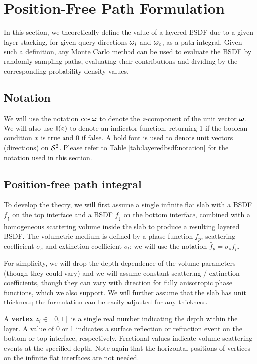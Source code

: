 \section{Position-Free Path Formulation}
\label{sec:layeredbsdf:pathformulation}

In this section, we theoretically define the value of a layered BSDF due to a given layer stacking, for given query directions $\bm{\omega}_i$ and $\bm{\omega}_o$, as a path integral. Given such a definition, any Monte Carlo method can be used to evaluate the BSDF by randomly sampling paths, evaluating their contributions and dividing by the corresponding probability density values.

\subsection{Notation}

We will use the notation $\cos \bm{\omega}$ to denote the $z$-component of the unit vector $\bm{\omega}$. We will also use $\mathbb{I}(x)$ to denote an indicator function, returning 1 if the boolean condition $x$ is true and 0 if false. A bold font is used to denote unit vectors (directions) on ${\mathcal S^2}$. Please refer to Table \ref{tab:layeredbsdf:notation} for the notation used in this section.



\subsection{Position-free path integral}

To develop the theory, we will first assume a single infinite flat slab with a BSDF $f_\uparrow$ on the top interface and a BSDF $f_\downarrow$ on the bottom interface, combined with a homogeneous scattering volume inside the slab to produce a resulting layered BSDF. The volumetric medium is defined by a phase function $f_p$, scattering coefficient $\sigma_s$ and extinction coefficient $\sigma_t$; we will use the notation $\hat f_p = \sigma_s f_p$.

For simplicity, we will drop the depth dependence of the volume parameters (though they could vary) and we will assume constant scattering / extinction coefficients, though they can vary with direction for fully anisotropic phase functions, which we also support. We will further assume that the slab has unit thickness; the formulation can be easily adjusted for any thickness.

A {\bf vertex} $z_i \in [0, 1]$ is a single real number indicating the depth within the layer. A value of 0 or 1 indicates a surface reflection or refraction event on the bottom or top interface, respectively. Fractional values indicate volume scattering events at the specified depth. Note again that the horizontal positions of vertices on the infinite flat interfaces are not needed.

